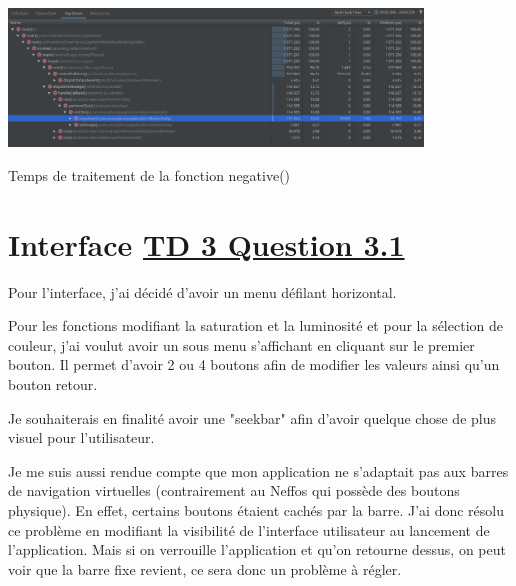 \documentclass{article}
\begin{document}
\begin{center} 
    \includegraphics[width=11cm]{../Image_temps/TempsNegative}

    Temps de traitement de la fonction negative()
\end{center}

\newpage
\section{Interface \underline{TD 3 Question 3.1}}
Pour l'interface, j'ai décidé d'avoir un menu défilant horizontal.

Pour les fonctions modifiant la saturation et la luminosité et pour la sélection de couleur, j'ai voulut avoir un sous menu s'affichant en cliquant sur le premier bouton. Il permet d'avoir 2 ou 4 boutons afin de modifier les valeurs ainsi qu'un bouton retour.

Je souhaiterais en finalité avoir une "seekbar" afin d'avoir quelque chose de plus visuel pour l'utilisateur.
\bigbreak

Je me suis aussi rendue compte que mon application ne s’adaptait pas aux barres de navigation virtuelles (contrairement au Neffos qui possède des boutons physique). En effet, certains boutons étaient cachés par la barre. 
J'ai donc résolu ce problème en modifiant la visibilité de l'interface utilisateur au lancement de l'application. Mais si on verrouille l'application et qu'on retourne dessus, on peut voir que la barre fixe revient, ce sera donc un problème à régler.
\end{document}
